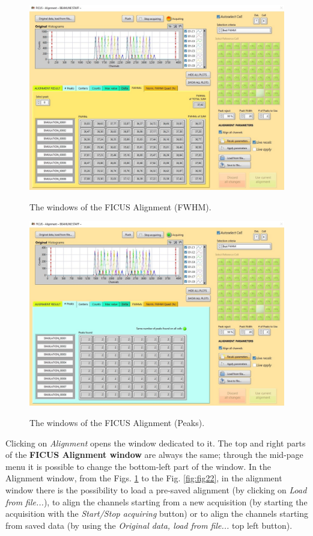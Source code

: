 \documentclass[a4paper,12pt,oneside,pdflatex,italian,final,twocolumn]{article}
\begin{document}
\begin{figure}[h!]
\centering
{\includegraphics[width=.7\textwidth]{Cattura88.jpg}} \quad
\caption{The windows of the FICUS Alignment (FWHM).}\label{fig:fig46}
\end{figure}

\begin{figure}[h!]
\centering
{\includegraphics[width=.7\textwidth]{Cattura83.jpg}} \quad
\caption{The windows of the FICUS Alignment (Peaks).}\label{fig:fig47}
\end{figure}

Clicking on \textit{Alignment} opens the window dedicated to it. The top and right parts of the \textbf{FICUS Alignment window} are always the same; through the mid-page menu it is possible to change the bottom-left part of the window.
In the Alignment window, from the Figs. \ref{fig:fig46} to the Fig. \ref{fig:fig22}, in the alignment window there is the possibility to load a pre-saved alignment (by clicking on \textit{Load from file...}), to align the channels starting from a new acquisition (by starting the acquisition with the \textit{Start/Stop acquiring} button) or to align the channels starting from saved data (by using the \textit{Original data, load from file...} top left button).
\end{document}
